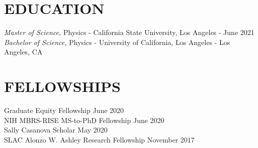 \documentclass[margin,line]{res}
\begin{document}
\begin{resume}
%

\iffalse
\section{OBJECTIVE}
To pursue a Physics PhD in Quantum Information and Computing.
\fi

\section{EDUCATION}
{\sl Master of Science,} Physics - California State University, Los Angeles - June 2021
\\
{\sl Bachelor of Science,} Physics - University of California, Los Angeles - Los Angeles, CA

\section{FELLOWSHIPS}  
Graduate Equity Fellowship \hfill June 2020 \\
NIH MBRS-RISE MS-to-PhD Fellowship \hfill June 2020 \\
Sally Casanova Scholar \hfill May 2020 \\
SLAC Alonzo W. Ashley Research Fellowship \hfill November 2017 \\


\end{resume}
\end{document}
